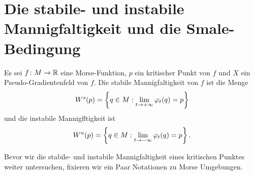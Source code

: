 \section{Die stabile- und instabile Mannigfaltigkeit und die Smale-Bedingung}

\begin{definition}
    \label{def: stabile und instabile mannigfaltigkeit}
    Es sei $f \colon M \to { \mathbb R }$ eine Morse-Funktion, $p$ ein kritischer Punkt von $f$ und $X$ ein
    Pseudo-Gradientenfeld von $f$. Die stabile Mannigfaltigkeit von $f$ ist die Menge
    \[ { W^s } (p) = \left\{ q \in M : \lim_{t \to + \infty} \varphi_t(q) = p \right\} \]
    und die instabile Mannigfltigkeit ist
    \[ { W^u } (p) = \left\{ q \in M : \lim_{t \to - \infty} \varphi_t(q) = p \right\} . \]
\end{definition}

Bevor wir die stabile- und instabile Mannigfaltigkeit eines kritischen Punktes weiter untersuchen, 
fixieren wir ein Paar Notationen zu Morse Umgebungen.

